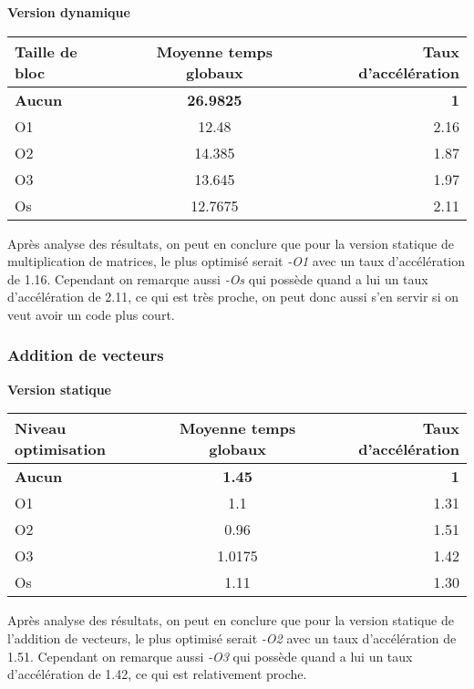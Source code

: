 \documentclass{rapport}
\begin{document}
\textbf{Version dynamique}
\begin{center}
    \begin{tabular}{ l|c|r }
        Taille de bloc & Moyenne temps globaux & Taux d'accélération \\
        \hline
        \textbf{Aucun} & \textbf{ 26.9825 } & \textbf{1} \\
        O1 & 12.48 & 2.16 \\
        O2 & 14.385 & 1.87 \\
        O3 & 13.645 & 1.97 \\
        Os & 12.7675 & 2.11 \\
    \end{tabular}
\end{center}
Après analyse des résultats, on peut en conclure que pour la version statique de multiplication de matrices, le plus optimisé serait \textit{-O1} avec un taux d'accélération de 1.16.
\newline Cependant on remarque aussi \textit{-Os} qui possède quand a lui un taux d'accélération de 2.11, ce qui est très proche, on peut donc aussi s'en servir si on veut avoir un code plus court.


\subsubsection{Addition de vecteurs}
\textbf{Version statique}
\begin{center}
    \begin{tabular}{ l|c|r }
        Niveau optimisation & Moyenne temps globaux & Taux d'accélération \\
        \hline
        \textbf{Aucun} & \textbf{1.45} & \textbf{1} \\
        O1 & 1.1 & 1.31 \\
        O2 & 0.96 & 1.51 \\
        O3 & 1.0175 & 1.42 \\
        Os & 1.11 & 1.30 \\
    \end{tabular}
\end{center}
Après analyse des résultats, on peut en conclure que pour la version statique de l'addition de vecteurs, le plus optimisé serait \textit{-O2} avec un taux d'accélération de 1.51.
\newline Cependant on remarque aussi \textit{-O3} qui possède quand a lui un taux d'accélération de 1.42, ce qui est relativement proche.
\end{document}
